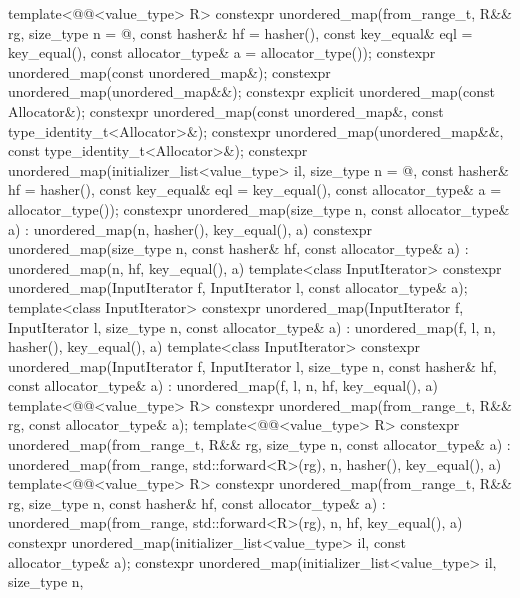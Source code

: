 \begin{codeblock}
{{    template<@@<value_type> R>
      constexpr unordered_map(from_range_t, R&& rg, size_type n = @\seebelow@,
                              const hasher& hf = hasher(), const key_equal& eql = key_equal(),
                              const allocator_type& a = allocator_type());
    constexpr unordered_map(const unordered_map&);
    constexpr unordered_map(unordered_map&&);
    constexpr explicit unordered_map(const Allocator&);
    constexpr unordered_map(const unordered_map&, const type_identity_t<Allocator>&);
    constexpr unordered_map(unordered_map&&, const type_identity_t<Allocator>&);
    constexpr unordered_map(initializer_list<value_type> il, size_type n = @\seebelow@,
                            const hasher& hf = hasher(),
                            const key_equal& eql = key_equal(),
                            const allocator_type& a = allocator_type());
    constexpr unordered_map(size_type n, const allocator_type& a)
      : unordered_map(n, hasher(), key_equal(), a) { }
    constexpr unordered_map(size_type n, const hasher& hf, const allocator_type& a)
      : unordered_map(n, hf, key_equal(), a) { }
    template<class InputIterator>
      constexpr unordered_map(InputIterator f, InputIterator l, const allocator_type& a);
    template<class InputIterator>
      constexpr unordered_map(InputIterator f, InputIterator l, size_type n,
                              const allocator_type& a)
        : unordered_map(f, l, n, hasher(), key_equal(), a) { }
    template<class InputIterator>
      constexpr unordered_map(InputIterator f, InputIterator l, size_type n, const hasher& hf,
                              const allocator_type& a)
        : unordered_map(f, l, n, hf, key_equal(), a) { }
    template<@@<value_type> R>
      constexpr unordered_map(from_range_t, R&& rg, const allocator_type& a);
    template<@@<value_type> R>
      constexpr unordered_map(from_range_t, R&& rg, size_type n, const allocator_type& a)
        : unordered_map(from_range, std::forward<R>(rg), n, hasher(), key_equal(), a) { }
    template<@@<value_type> R>
      constexpr unordered_map(from_range_t, R&& rg, size_type n, const hasher& hf,
                              const allocator_type& a)
        : unordered_map(from_range, std::forward<R>(rg), n, hf, key_equal(), a) { }
    constexpr unordered_map(initializer_list<value_type> il, const allocator_type& a);
    constexpr unordered_map(initializer_list<value_type> il, size_type n,
}}
\end{codeblock}
